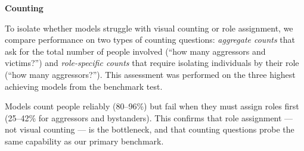 \textbf{Counting}

To isolate whether models struggle with visual counting or role
assignment, we compare performance on two types of counting questions:
\emph{aggregate counts} that ask for the total number of people involved
(``how many aggressors and victims?'') and \emph{role-specific counts}
that require isolating individuals by their role (``how many
aggressors?''). This assessment was performed on the three highest achieving models 
from the benchmark test.

\begin{table}[t]
\centering
\caption{\textbf{Counting accuracy on 4-option questions} (chance = 25\%).
Aggregate counts require detecting people involved; role-specific counts
require assigning aggressor/victim/bystander roles first.
\textbf{Best} and \underline{second-best} performance are highlighted.}
\label{tab:counting}
\end{table}

Models count people reliably (80--96\%) but fail when they must assign
roles first (25--42\% for aggressors and bystanders).
This confirms that role assignment --- not visual counting --- is the
bottleneck, and that counting questions probe the same capability as our
primary benchmark.
